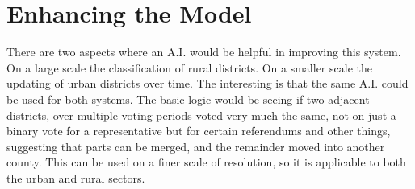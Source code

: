 \documentclass[12pt]{article}
\begin{document}
\section{Enhancing the Model}
There are two aspects where an A.I. would be helpful in improving this system. On a large scale the classification of rural districts. On a smaller scale the updating of urban districts over time. The interesting is that the same A.I. could be used for both systems. The basic logic would be seeing if two adjacent districts, over multiple voting periods voted very much the same, not on just a binary vote for a representative but for certain referendums and other things, suggesting that parts can be merged, and the remainder moved into another county. This can be used on a finer scale of resolution, so it is applicable to both the urban and rural sectors.
\end{document}
